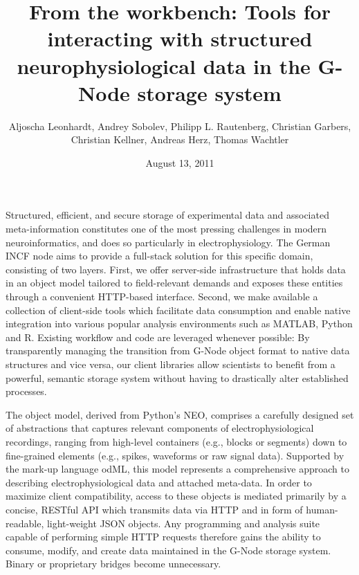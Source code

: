 \documentclass[a4paper]{article}
\begin{document}
\title{From the workbench: Tools for interacting with structured
  neurophysiological data in the G-Node storage system}

\author{

  Aljoscha Leonhardt,
  Andrey Sobolev,
  Philipp L. Rautenberg,
  Christian Garbers,
  Christian Kellner,
  Andreas Herz,
  Thomas Wachtler

}
\date{August 13, 2011}

\maketitle


Structured, efficient, and secure storage of experimental data and
associated meta-information constitutes one of the most pressing
challenges in modern neuroinformatics, and does so particularly in
electrophysiology. The German INCF node aims to provide a full-stack
solution for this specific domain, consisting of two layers. First, we
offer server-side infrastructure that holds data in an object model
tailored to field-relevant demands and exposes these entities through
a convenient HTTP-based interface. Second, we make available a
collection of client-side tools which facilitate data consumption and
enable native integration into various popular analysis environments
such as MATLAB, Python and R. Existing workflow and code are leveraged
whenever possible: By transparently managing the transition from
G-Node object format to native data structures and vice versa, our
client libraries allow scientists to benefit from a powerful, semantic
storage system without having to drastically alter established
processes.

The object model, derived from Python's NEO, comprises a carefully
designed set of abstractions that captures relevant components of
electrophysiological recordings, ranging from high-level containers
(e.g., blocks or segments) down to fine-grained elements (e.g.,
spikes, waveforms or raw signal data). Supported by the mark-up
language odML, this model represents a comprehensive approach to
describing electrophysiological data and attached meta-data. In order
to maximize client compatibility, access to these objects is mediated
primarily by a concise, RESTful API which transmits data via HTTP and
in form of human-readable, light-weight JSON objects. Any programming
and analysis suite capable of performing simple HTTP requests
therefore gains the ability to consume, modify, and create data
maintained in the G-Node storage system. Binary or proprietary bridges
become unnecessary.
\end{document}
